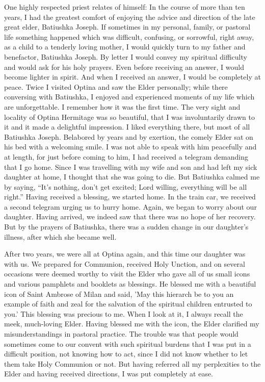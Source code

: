 \begin{longquote}{One highly respected priest relates of himself: }
In the course of more than ten years, I had the greatest comfort of enjoying the advice and direction of the late great elder, Batiushka Joseph. If sometimes in my personal, family, or pastoral life something happened which was difficult, confusing, or sorrowful, right away, as a child to a tenderly loving mother, I would quickly turn to my father and benefactor, Batiushka Joseph. By letter I would convey my spiritual difficulty and would ask for his holy prayers. Even before receiving an answer, I would become lighter in spirit. And when I received an answer, I would be completely at peace. Twice I visited Optina and saw the Elder personally; while there conversing with Batiushka, I enjoyed and experienced moments of my life which are unforgettable. I remember how it was the first time. The very sight and locality of Optina Hermitage was so beautiful, that I was involuntarily drawn to it and it made a delightful impression. I liked everything there, but most of all Batiushka Joseph. Belabored by years and by exertion, the comely Elder sat on his bed with a welcoming smile. I was not able to speak with him peacefully and at length, for just before coming to him, I had received a telegram demanding that I go home. Since I was travelling with my wife and son and had left my sick daughter at home, I thought that she was going to die. But Batiushka calmed me by saying, ``It's nothing, don't get excited; Lord willing, everything will be all right.'' Having received a blessing, we started home. In the train car, we received a second telegram urging us to hurry home. Again, we began to worry about our daughter. Having arrived, we indeed saw that there was no hope of her recovery. But by the prayers of Batiushka, there was a sudden change in our daughter's illness, after which she became well.

After two years, we were all at Optina again, and this time our daughter was with us. We prepared for Communion, received Holy Unction, and on several occasions were deemed worthy to visit the Elder who gave all of us small icons and various pamphlets and booklets as blessings. He blessed me with a beautiful icon of Saint Ambrose of Milan and said, 'May this hierarch be to you an example of faith and zeal for the salvation of the spiritual children entrusted to you.' This blessing was precious to me. When I look at it, I always recall the meek, much-loving Elder. Having blessed me with the icon, the Elder clarified my misunderstandings in pastoral practice. The trouble was that people would sometimes come to our convent with such spiritual burdens that I was put in a difficult position, not knowing how to act, since I did not know whether to let them take Holy Communion or not. But having referred all my perplexities to the Elder and having received directions, I was put completely at ease.


\end{longquote}
